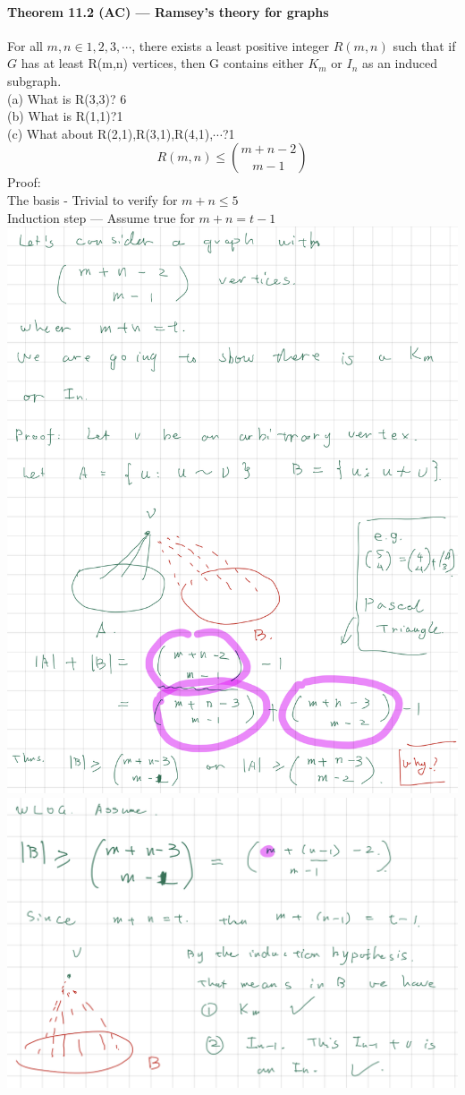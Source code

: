 \documentclass{article}
\begin{document}
\paragraph{Theorem 11.2 (AC) — Ramsey’s theory for graphs}
For all $m,n\in {1,2,3,\cdots}$, there exists a least positive integer $R(m,n)$ such that if $G$ has at least R(m,n) vertices, then G contains either $K_m$ or $I_n$ as an induced subgraph.\\
(a) What is R(3,3)? 6\\
(b) What is R(1,1)?1\\
(c) What about R(2,1),R(3,1),R(4,1),$\cdots$?1\\
$$R(m,n)\leq \binom{m+n-2}{m-1}$$
Proof:\\
The basis - Trivial to verify for $m+n\leq 5$\\
Induction step — Assume true for $m+n=t-1$\\
\includegraphics{0111}\\
\includegraphics{0112}
\end{document}
